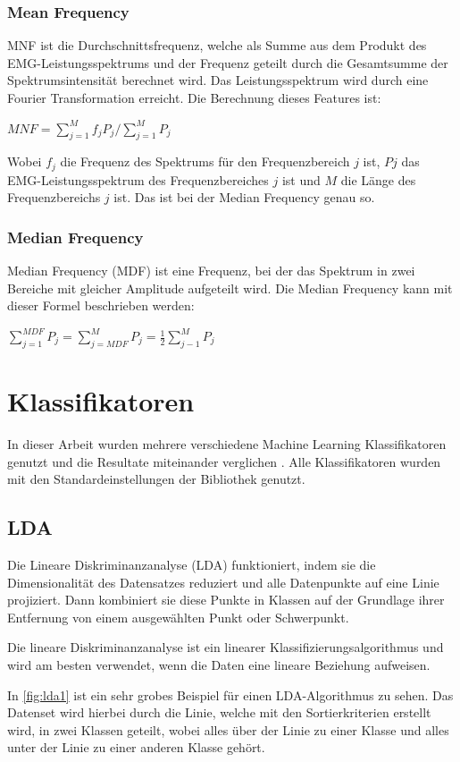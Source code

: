 \subsubsection{Mean Frequency}
MNF ist die Durchschnittsfrequenz, welche als Summe aus dem Produkt des EMG-Leistungsspektrums und der Frequenz geteilt durch die Gesamtsumme der Spektrumsintensität berechnet wird. Das Leistungsspektrum wird durch eine Fourier Transformation erreicht. Die Berechnung dieses Features ist:

$MNF = \sum_{j=1}^{M} f_{j} P_{j} / \sum_{j=1}^{M} P_{j}$

Wobei $ f_{j}$ die Frequenz des Spektrums für den  Frequenzbereich $j$ ist, $Pj$ das EMG-Leistungsspektrum  des Frequenzbereiches  $j$ ist und $M$  die Länge des Frequenzbereichs $j$ ist. Das ist bei der Median Frequency genau so.

\subsubsection{Median Frequency}
Median Frequency (MDF) ist eine Frequenz, bei der das Spektrum in zwei Bereiche mit gleicher Amplitude aufgeteilt wird. Die Median Frequency kann mit dieser Formel beschrieben werden:


$\sum_{j=1}^{MDF} P_{j} = \sum_{j=MDF}^{M} P_{j} = \frac{1}{2} \sum_{j-1}^{M} P_{j}$


\section{Klassifikatoren}
In dieser Arbeit wurden mehrere verschiedene Machine Learning Klassifikatoren genutzt und die Resultate miteinander verglichen \cite{ShwDav2014-ATO}. Alle Klassifikatoren wurden mit den Standardeinstellungen der Bibliothek genutzt.

\subsection{LDA}
Die Lineare Diskriminanzanalyse (LDA) funktioniert, indem sie die Dimensionalität des Datensatzes reduziert und alle Datenpunkte auf eine Linie projiziert. Dann kombiniert sie diese Punkte in Klassen auf der Grundlage ihrer Entfernung von einem ausgewählten Punkt oder Schwerpunkt.

Die lineare Diskriminanzanalyse ist ein linearer Klassifizierungsalgorithmus und wird am besten verwendet, wenn die Daten eine lineare Beziehung aufweisen.

In \ref{fig:lda1} ist ein sehr grobes Beispiel für einen LDA-Algorithmus zu sehen. Das Datenset wird hierbei durch die Linie, welche mit den Sortierkriterien erstellt wird, in zwei Klassen geteilt, wobei alles über der Linie zu einer Klasse und alles unter der Linie zu einer anderen Klasse gehört.

